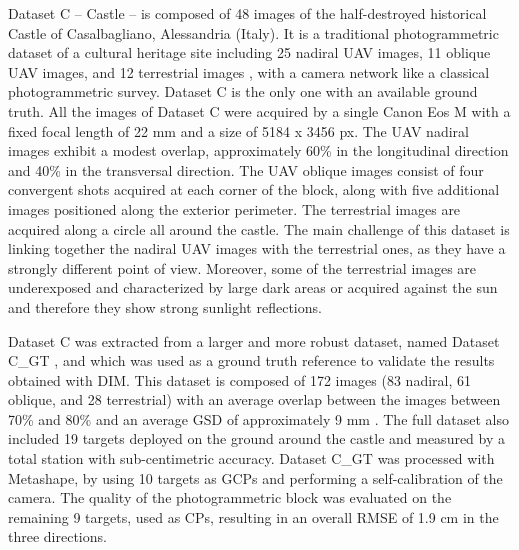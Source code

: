 Dataset C – Castle – is composed of 48 images of the half-destroyed historical Castle of Casalbagliano, Alessandria (Italy). 
It is a traditional photogrammetric dataset of a cultural heritage site including 25 nadiral UAV images, 11 oblique UAV images, and 12 terrestrial images , with a camera network like a classical photogrammetric survey. 
Dataset C is the only one with an available ground truth. 
All the images of Dataset C were acquired by a single Canon Eos M with a fixed focal length of 22 mm and a size of 5184 x 3456 px.
The UAV nadiral images exhibit a modest overlap, approximately 60\% in the longitudinal direction and 40\% in the transversal direction. 
The UAV oblique images consist of four convergent shots acquired at each corner of the block, along with five additional images positioned along the exterior perimeter. 
The terrestrial images are acquired along a circle all around the castle. 
The main challenge of this dataset is linking together the nadiral UAV images with the terrestrial ones, as they have a strongly different point of view. 
Moreover, some of the terrestrial images are underexposed and characterized by large dark areas or acquired against the sun and therefore they show strong sunlight reflections. 

Dataset C was extracted from a larger and more robust dataset, named Dataset C\_GT , and which was used as a ground truth reference to validate the results obtained with DIM.
This dataset is composed of 172 images (83 nadiral, 61 oblique, and 28 terrestrial) with an average overlap between the images between 70\% and 80\% and an average GSD of approximately 9 mm \cite{Gagliolo2017_uav_conservation_histo, gagliolo2018_parameter_optim}. 
The full dataset also included 19 targets deployed on the ground around the castle and measured by a total station with sub-centimetric accuracy. Dataset C\_GT was processed with Metashape, by using 10 targets as GCPs and performing a self-calibration of the camera. The quality of the photogrammetric block was evaluated on the remaining 9 targets, used as CPs, resulting in an overall RMSE of 1.9 cm in the three directions.

